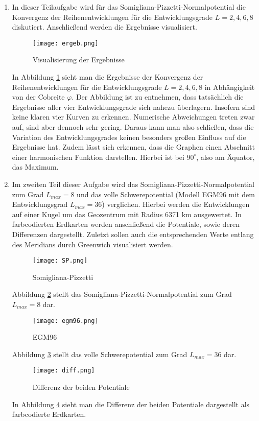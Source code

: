 \begin{enumerate}
\item In dieser Teilaufgabe wird für das Somigliana-Pizzetti-Normalpotential die Konvergenz der Reihenentwicklungen für die Entwicklungsgrade $L=2,4,6,8$ diskutiert. Anschließend werden die Ergebnisse visualisiert.

\begin{figure}[H]
\centering
\texttt{[image: ergeb.png]}
\caption{Visualisierung der Ergebnisse}
\label{ergeb}
\end{figure}

In Abbildung \ref{ergeb} sieht man die Ergebnisse der Konvergenz der Reihenentwicklungen für die Entwicklungsgrade $L=2,4,6,8$ in Abhängigkeit von der Cobreite $\varphi$. Der Abbildung ist zu entnehmen, dass tatsächlich die Ergebnisse aller vier Entwicklungsgrade sich nahezu überlagern. Insofern sind keine klaren vier Kurven zu erkennen. Numerische Abweichungen treten zwar auf, sind aber dennoch sehr gering. Daraus kann man also schließen, dass die Variation des Entwicklungsgrades keinen besonders großen Einfluss auf die Ergebnisse hat. Zudem lässt sich erkennen, dass die Graphen einen Abschnitt einer harmonischen Funktion darstellen. Hierbei ist bei $90^{\circ}$, also am Äquator, das Maximum.   

\item Im zweiten Teil dieser Aufgabe wird das Somigliana-Pizzetti-Normalpotential zum Grad $L_{max}=8$ und das volle Schwerepotential (Modell EGM96 mit dem Entwicklungsgrad $L_{max} = 36$) verglichen. Hierbei werden die Entwicklungen auf einer Kugel um das Geozentrum mit Radius 6371 km ausgewertet. In farbcodierten Erdkarten werden anschließend die Potentiale, sowie deren Differenzen dargestellt. Zuletzt sollen auch die entsprechenden Werte entlang des Meridians durch Greenwich visualisiert werden. 

\begin{figure}[H]
	\centering
	\texttt{[image: SP.png]}
	\caption{Somigliana-Pizzetti}
	\label{sp}
\end{figure}

Abbildung \ref{sp} stellt das Somigliana-Pizzetti-Normalpotential zum Grad $L_{max}=8$ dar.

\begin{figure}[H]
	\centering
	\texttt{[image: egm96.png]}
	\caption{EGM96}
	\label{egm96}
\end{figure}

Abbildung \ref{egm96} stellt das volle Schwerepotential zum Grad $L_{max}=36$ dar.

\begin{figure}[H]
	\centering
	\texttt{[image: diff.png]}
	\caption{Differenz der beiden Potentiale}
	\label{diff}
\end{figure}

In Abbildung \ref{diff} sieht man die Differenz der beiden Potentiale dargestellt als farbcodierte Erdkarten. 

 
\end{enumerate}
